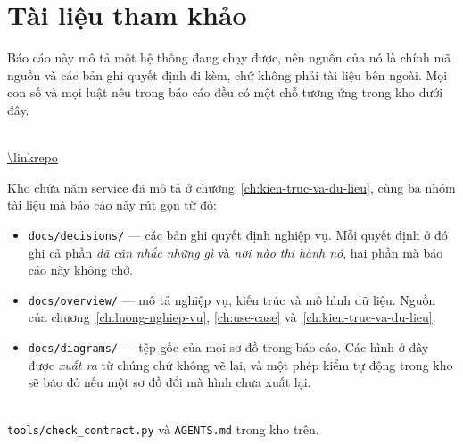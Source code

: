 \chapter*{Tài liệu tham khảo}
\label{ch:tham-khao}

Báo cáo này mô tả một hệ thống đang chạy được, nên nguồn của nó là chính mã nguồn và các bản ghi
quyết định đi kèm, chứ không phải tài liệu bên ngoài. Mọi con số và mọi luật nêu trong báo cáo
đều có một chỗ tương ứng trong kho dưới đây.

\begin{description}[itemsep=1.1em,parsep=0.35em,leftmargin=0pt]

  \item[Mã nguồn và tài liệu kỹ thuật của dự án]\mbox{}\\
  \url{\linkrepo}
  \medskip

  Kho chứa năm service đã mô tả ở chương~\ref{ch:kien-truc-va-du-lieu}, cùng ba nhóm tài liệu
  mà báo cáo này rút gọn từ đó:

  \begin{itemize}
    \item \texttt{docs/decisions/} --- các bản ghi quyết định nghiệp vụ. Mỗi quyết định ở đó ghi
          cả phần \emph{đã cân nhắc những gì} và \emph{nơi nào thi hành nó}, hai phần mà báo cáo
          này không chở.
    \item \texttt{docs/overview/} --- mô tả nghiệp vụ, kiến trúc và mô hình dữ liệu. Nguồn của
          chương~\ref{ch:luong-nghiep-vu}, \ref{ch:use-case} và~\ref{ch:kien-truc-va-du-lieu}.
    \item \texttt{docs/diagrams/} --- tệp gốc của mọi sơ đồ trong báo cáo. Các hình ở đây được
          \emph{xuất ra} từ chúng chứ không vẽ lại, và một phép kiểm tự động trong kho sẽ báo đỏ
          nếu một sơ đồ đổi mà hình chưa xuất lại.
  \end{itemize}

  \item[Các luật được canh bằng máy]\mbox{}\\
  \texttt{tools/check\_contract.py} và \texttt{AGENTS.md} trong kho trên.
  \medskip

\end{description}

